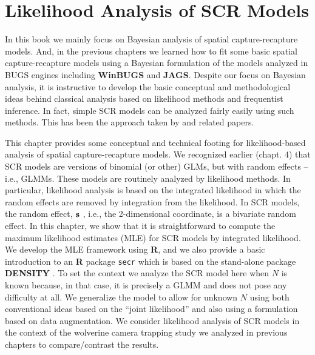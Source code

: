 \chapter{
Likelihood Analysis of SCR Models
}
\label{chapt.closed}


\vspace{.3in}



In this book we mainly focus on Bayesian analysis of spatial
capture-recapture models. And, in the previous chapters we learned how
to fit some basic spatial capture-recapture models using a Bayesian
formulation of the models analyzed in BUGS engines including {\bf
  WinBUGS} and {\bf JAGS}.  Despite our focus on Bayesian analysis, it
is instructive to develop the basic conceptual and methodological
ideas behind classical analysis based on likelihood methods and
frequentist inference.  In fact, simple SCR models can be analyzed
fairly easily using such methods. This has been the approach taken by
\citet{borchers_efford:2008, dawson_efford:2009} and related papers.

This chapter provides some conceptual and technical footing for
likelihood-based analysis of spatial capture-recapture models. We
recognized earlier (chapt. 4) that SCR models are versions of
binomial (or other) GLMs, but with random effects – i.e., GLMMs. These
models are 
routinely analyzed by likelihood methods. In particular, likelihood
analysis is based on the integrated likelihood in which the random
effects are removed by integration from the likelihood. In SCR models,
the random effect, ${\bf s}$ , i.e., the 2-dimensional coordinate, is a
bivariate random effect. In this chapter, we show that it is
straightforward to compute the maximum likelihood estimates (MLE) for
SCR models by integrated likelihood. We develop the MLE framework
using {\bf R}, and we also provide a basic introduction to an {\bf R} package
\mbox{\tt secr} \citep{efford:2011} which is based on the stand-alone
package 
{\bf DENSITY} \citep{efford_etal:2004}.
 To set the context we analyze the SCR model
here when $N$ is known because, in that case, it is precisely a GLMM and
does not pose any difficulty at all. We generalize the model to allow
for unknown $N$ using both conventional ideas based on the ``joint
likelihood'' \citep[e.g.,][]{borchers_etal:2002}
and also using a formulation
based on data augmentation.  We consider likelihood analysis of SCR
models in the context of the wolverine camera trapping study \citep{magoun_etal:2011}
 we analyzed in previous chapters to compare/contrast the
results.

